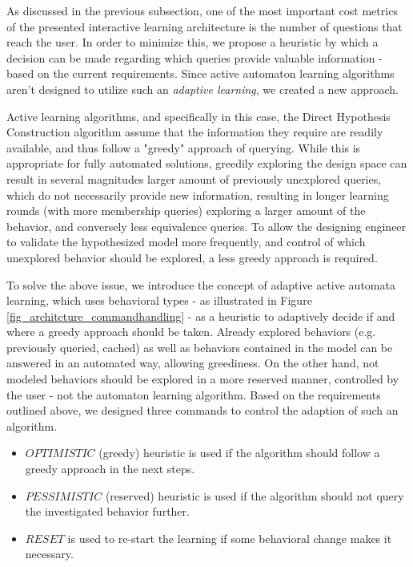 As discussed in the previous subsection, one of the most important cost metrics of the presented interactive learning architecture is the number of questions that reach the user. In order to minimize this, we propose a heuristic by which a decision can be made regarding which queries provide valuable information - based on the current requirements. Since active automaton learning algorithms aren't designed to utilize such an \textit{adaptive learning}, we created a new approach. 

Active learning algorithms, and specifically in this case, the Direct Hypothesis Construction algorithm assume that the information they require are readily available, and thus follow a "greedy" approach of querying. While this is appropriate for fully automated solutions, greedily exploring the design space can result in several magnitudes larger amount of previously unexplored queries, which do not necessarily provide new information, resulting in longer learning rounds (with more membership queries) exploring a larger amount of the behavior, and conversely less equivalence queries. To allow the designing engineer to validate the hypothesized model more frequently, and control of which unexplored behavior should be explored, a less greedy approach is required.

To solve the above issue, we introduce the concept of adaptive active automata learning, which uses behavioral types - as illustrated in Figure \ref{fig_architcture_commandhandling} - as a heuristic to adaptively decide if and where a greedy approach should be taken. Already explored behaviors (e.g. previously queried, cached) as well as behaviors contained in the model can be answered in an automated way, allowing greediness. On the other hand, not modeled behaviors should be explored in a more reserved manner, controlled by the user - not the automaton learning algorithm. Based on the requirements outlined above, we designed three commands to control the adaption of such an algorithm.

\begin{itemize}
	\item $OPTIMISTIC$ (greedy) heuristic is used if the algorithm should follow a greedy approach in the next steps.
	\item $PESSIMISTIC$ (reserved) heuristic is used if the algorithm should not query the investigated behavior further.
	\item $RESET$ is used to re-start the learning if some behavioral change makes it necessary.
\end{itemize}

